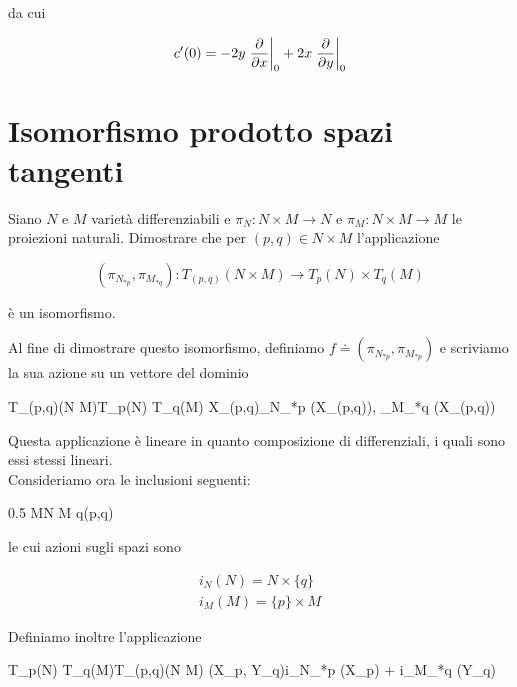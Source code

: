 da cui

\begin{equation}
	c'(0) = - 2 y \eval{ \pdv{x} }_{0} + 2 x \eval{ \pdv{y} }_{0}
\end{equation}

%

\newpage

%

\section{Isomorfismo prodotto spazi tangenti}\label{es2-11}

\begin{tcolorbox}
	Siano $ N $ e $ M $ varietà differenziabili e $ \pi_{N} : N \times M \to N $ e $ \pi_{M} : N \times M \to M $ le proiezioni naturali. Dimostrare che per $ (p,q) \in N \times M $ l'applicazione
	
	\begin{equation}
		(\pi_{N_{*p}},\pi_{M_{*q}}) : T_{(p,q)}(N \times M) \to T_{p}(N) \times T_{q}(M)
	\end{equation}
	
	è un isomorfismo.
\end{tcolorbox}


Al fine di dimostrare questo isomorfismo, definiamo $ f \doteq (\pi_{N_{*p}},\pi_{M_{*p}}) $ e scriviamo la sua azione su un vettore del dominio

	{T_{(p,q)}(N \times M)}{T_{p}(N) \times T_{q}(M)}
	{X_{(p,q)}}{\pi_{N_{*p}} (X_{(p,q)}), \pi_{M_{*q}} (X_{(p,q)})}
	
Questa applicazione è lineare in quanto composizione di differenziali, i quali sono essi stessi lineari.\\
Consideriamo ora le inclusioni seguenti:

	{0.5}{%
				{M}{N \times M}
				{q}{(p,q)}
			}

le cui azioni sugli spazi sono

\begin{gather}
	i_{N}(N) = N \times \{q\}\\
	i_{M}(M) = \{p\} \times M
\end{gather}

Definiamo inoltre l'applicazione

	{T_{p}(N) \times T_{q}(M)}{T_{(p,q)}(N \times M)}
	{(X_{p}, Y_{q})}{i_{N_{*p}} (X_{p}) + i_{M_{*q}} (Y_{q})}

